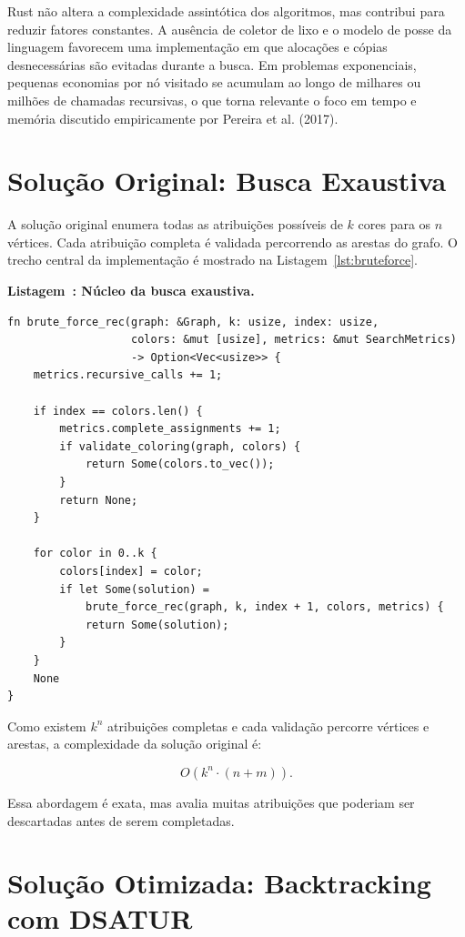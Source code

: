\documentclass[12pt]{article}
\renewcommand{\listingscaption}{Listagem}
\newcommand{\codetitle}[2]{%
  \refstepcounter{listing}\label{#1}%
  \noindent\textbf{\listingscaption~\thelisting: #2}\par\nopagebreak
  \vspace{0.25\baselineskip}%
}
\begin{document}
Rust não altera a complexidade assintótica dos algoritmos, mas contribui para
reduzir fatores constantes. A ausência de coletor de lixo e o modelo de posse da
linguagem favorecem uma implementação em que alocações e cópias desnecessárias
são evitadas durante a busca. Em problemas exponenciais, pequenas economias por
nó visitado se acumulam ao longo de milhares ou milhões de chamadas recursivas,
o que torna relevante o foco em tempo e memória discutido empiricamente por
Pereira et al. (2017).

\section{Solução Original: Busca Exaustiva}

A solução original enumera todas as atribuições possíveis de $k$ cores para os
$n$ vértices. Cada atribuição completa é validada percorrendo as arestas do
grafo. O trecho central da implementação é mostrado na
Listagem~\ref{lst:bruteforce}.

\codetitle{lst:bruteforce}{Núcleo da busca exaustiva.}
\begin{verbatim}
fn brute_force_rec(graph: &Graph, k: usize, index: usize,
                   colors: &mut [usize], metrics: &mut SearchMetrics)
                   -> Option<Vec<usize>> {
    metrics.recursive_calls += 1;

    if index == colors.len() {
        metrics.complete_assignments += 1;
        if validate_coloring(graph, colors) {
            return Some(colors.to_vec());
        }
        return None;
    }

    for color in 0..k {
        colors[index] = color;
        if let Some(solution) =
            brute_force_rec(graph, k, index + 1, colors, metrics) {
            return Some(solution);
        }
    }
    None
}
\end{verbatim}

Como existem $k^n$ atribuições completas e cada validação percorre vértices e
arestas, a complexidade da solução original é:

\[
O(k^n \cdot (n + m)).
\]

Essa abordagem é exata, mas avalia muitas atribuições que poderiam ser
descartadas antes de serem completadas.

\section{Solução Otimizada: Backtracking com DSATUR}
\end{document}
